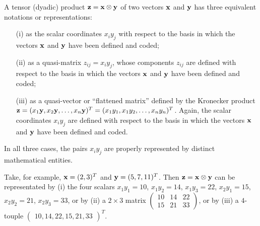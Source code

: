 A tensor (dyadic) product ${\bf z} = {\bf x} \otimes {\bf y}$ of two vectors ${\bf x}$ and ${\bf y}$
has three equivalent notations or representations:
\begin{itemize}
\item[(i)]
as the scalar coordinates $x_iy_j$ with respect to the basis in which the vectors ${\bf  x}$ and ${\bf y}$ have been defined and coded;
\item[(ii)]
as a quasi-matrix $z_{ij}  =x_iy_j$,
whose components $z_{ij}$ are  defined with respect to the basis in which the vectors ${\bf  x}$ and ${\bf y}$
have been defined and coded;
\item[(iii)]
as a quasi-vector or ``flattened matrix'' defined by the Kronecker product
${\bf z} = ({ x}_1  {\bf y}, { x}_2  {\bf y}, \ldots , { x}_n  {\bf y})^T=
({ x}_1  { y}_1, { x}_1  { y}_2, \ldots , { x}_n  { y}_n)^T
$. Again, the scalar coordinates $x_iy_j$ are defined
with respect to the basis in which the vectors ${\bf  x}$ and ${\bf y}$ have been defined and coded.
\end{itemize}
In all three cases, the pairs $x_i y_j$  are properly represented by distinct mathematical entities.

{\color{blue}
\bexample
Take, for example,
${\bf x}=(2,3)^T$
and
${\bf y}=(5,7,11)^T$.
Then ${\bf z} = {\bf x} \otimes {\bf y}$  can be representated by
(i) the four scalars
$x_1y_1=10$,
$x_1y_2=14$,
$x_1y_3=22$,
$x_2y_1=15$,
$x_2y_2=21$,
$x_2y_3=33$,
or by
(ii) a $2 \times 3$ matrix
$
\begin{pmatrix}
10&14&22\\
15&21&33
\end{pmatrix}
$,
or by
(iii) a $4$-touple
$
\begin{pmatrix}  10,14,22,15,21,33\end{pmatrix} ^T
$.
\eexample
}

